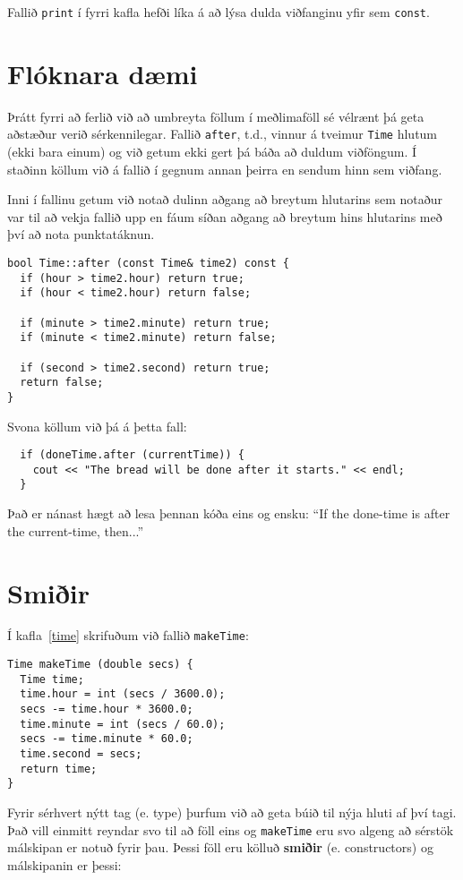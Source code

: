 Fallið {\tt print} í fyrri kafla hefði líka á að lýsa dulda viðfanginu yfir sem {\tt const}.

\section {Flóknara dæmi}

Þrátt fyrri að ferlið við að umbreyta föllum í meðlimaföll sé vélrænt þá geta aðstæður verið sérkennilegar.
Fallið {\tt after}, t.d., vinnur á tveimur {\tt Time} hlutum (ekki bara einum) og við getum ekki gert þá báða að duldum viðföngum.
Í staðinn köllum við á fallið í gegnum annan þeirra en sendum hinn sem viðfang.

Inni í fallinu getum við notað dulinn aðgang að breytum hlutarins sem notaður var til að vekja fallið upp en fáum síðan aðgang að breytum hins hlutarins með því að nota punktatáknun.

\begin{verbatim}
bool Time::after (const Time& time2) const {
  if (hour > time2.hour) return true;
  if (hour < time2.hour) return false;

  if (minute > time2.minute) return true;
  if (minute < time2.minute) return false;

  if (second > time2.second) return true;
  return false;
}
\end{verbatim}
%
Svona köllum við þá á þetta fall:

\begin{verbatim}
  if (doneTime.after (currentTime)) {
    cout << "The bread will be done after it starts." << endl;
  }
\end{verbatim}
%
Það er nánast hægt að lesa þennan kóða eins og ensku:
``If the done-time is after the current-time, then...''

\section{Smiðir}

Í kafla~\ref{time} skrifuðum við fallið {\tt makeTime}:

\begin{verbatim}
Time makeTime (double secs) {
  Time time;
  time.hour = int (secs / 3600.0);
  secs -= time.hour * 3600.0;
  time.minute = int (secs / 60.0);
  secs -= time.minute * 60.0;
  time.second = secs;
  return time;
}
\end{verbatim}
%
Fyrir sérhvert nýtt tag (e. type) þurfum við að geta búið til nýja hluti af því tagi.
Það vill einmitt reyndar svo til að föll eins og {\tt makeTime} eru svo algeng að sérstök málskipan er notuð fyrir þau.
Þessi föll eru kölluð {\bf smiðir} (e. constructors) og málskipanin er þessi: 

